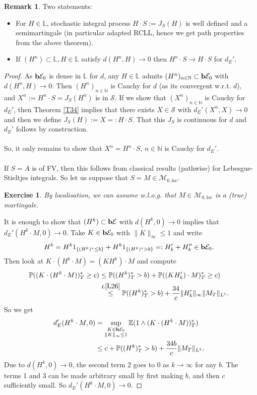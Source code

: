 \documentclass[12pt,a4paper, twoside]{article}
\newtheorem{exe}{Exercise}[section]
\theoremstyle{definition}
\newtheorem{rem}{Remark}[section]
\newcommand{\EE}{\mathbb{E}} %
\newcommand{\PP}{\mathbb{P}} %
\newcommand{\simple}{\textbf{\text{b}}\mathcal{E}}
\begin{document}
\begin{rem} Two statements:
\begin{itemize}
\item For $H \in \mathbb{L}$, stochastic integral process $H \cdot S:= J_S(H)$ is well defined and a semimartingale (in particular adapted RCLL, hence we get path properties from the above theorem).
\item If $(H^n) \subset \mathbb{L},  H \in \mathbb{L}$ satisfy $d(H^n, H) \to 0$ then $H^n \cdot S \to H \cdot S$ for $d_E'$. 
\end{itemize}
\end{rem}
\newpage
\begin{proof}
As $\simple_0$ is dense in $\mathbb{L}$ for $d$, any $H \in \mathbb{L}$ admits $(H^n)_{n \in \mathbb{N}} \subset \simple_0$ with $d(H^n, H) \to 0$. Then $(H^n)_{n \in \mathbb{N}}$ is Cauchy for $d$ (as its convergent w.r.t. $d$), and $X^n := H^n \cdot S = J_S(H^n)$ is in $\mathcal{S}$. If we show that $(X^n)_{n \in \mathbb{N}}$ is Cauchy for $d_E'$, then Theorem \ref{T34} implies that there exists $X \in \mathcal{S}$ with $d_E'(X^n,X) \to 0$ and then we define $J_S(H):= X=: H \cdot S$. That this $J_S$ is continuous for $d$ and $d_E'$ follows by construction.
\\\\
So,  it only remains to show that $X^n = H^n \cdot S$, $n \in \mathbb{N}$ is Cauchy for $d_E'$. 
\\\\
If $S=A$ is of FV, then this follows from classical results (pathwise) for Lebesgue-Stieltjes integrals. So let us suppose that $S=M \in \mathcal{M}_{0, \text{loc}}$. 
\begin{exe} By localisation, we can assume w.l.o.g. that $M \in \mathcal{M}_{0, \text{loc}}$ is a (true) martingale. 
\end{exe}
It is enough to show that $(H^k) \subset \simple$ with $d(H^k,0) \to 0$ implies that \\ $d_E'( H^k \cdot M, 0) \to 0$. Take $K \in \simple_0$ with $\|K\|_\infty \leq 1$ and write 
\begin{align*}
H^k = H^k 1_{\{ (H^k)^* \leq b \}} + H^k1_{\{ (H^k)^* > b\}} =: H_k' + H_k'' \in \simple_0.
\end{align*}
Then look at $K \cdot (H^k \cdot M) = (KH^k) \cdot M$ and compute
\begin{align*}
\PP((K \cdot (H^k \cdot M))_T^* \geq c) &\leq \PP((H^k)_T^* > b) + \PP((KH_k') \cdot M)_T^* \geq c) \\
& \overset{L \ref{L26}}\leq \PP((H^k)_T^* > b) + \frac{34}{c} \|H_k'\|_\infty \|M_T\|_{L^1}.
\end{align*}
So we get
\begin{align*}
d_E' ( H^k \cdot M, 0 ) &= \sup_{\substack{ K \in \simple_0 \\ \|K\|_\infty \leq 1}} \EE(1 \wedge (K \cdot (H^k \cdot M))_T^*) \\
& \leq c + \PP((H^k)_T^* > b) + \frac{34b}{c}\|M_T\|_{L^1}.
\end{align*}
Due to $d(H^k, 0) \to 0$, the second term 2 goes to $0$ as $k \to \infty$ for any $b$. The terms 1 and 3 can be made arbitrary small by first making $b$, and then $c$ sufficiently small. So $d_E'(H^k \cdot M, 0) \to 0$. 
\end{proof}
\end{document}

